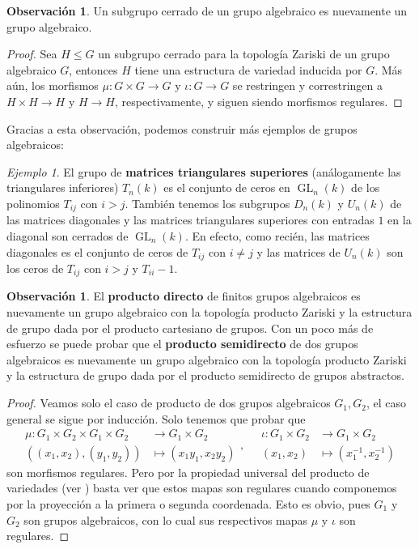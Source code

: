 \documentclass[spanish,12pt]{amsart}
\theoremstyle{definition}
\newtheorem{obs}[theorem]{Observación}
\theoremstyle{remark}
\newtheorem{example}[theorem]{Ejemplo}
\numberwithin{equation}{section}
\begin{document}
\begin{obs}\label{obs:subrupo cerrado de grupo algebraico es algebraico}
Un subgrupo cerrado de un grupo algebraico es nuevamente un grupo algebraico.
\end{obs}
\begin{proof}
Sea $H \leq G$ un subgrupo cerrado para la topología Zariski de un grupo algebraico $G$, entonces $H$ tiene una estructura de variedad inducida por $G$. Más aún, los morfismos $\mu : G \times G \to G$ y $\iota : G \to G$ se restringen y correstringen a $H \times H \to H$ y $H \to H$, respectivamente, y siguen siendo morfismos regulares.
\end{proof}

Gracias a esta observación, podemos construir más ejemplos de grupos algebraicos:
\begin{example}
El grupo de \textbf{matrices triangulares superiores} (análogamente las triangulares inferiores) $T_n (k)$ es el conjunto de ceros en $\operatorname{GL}_n (k)$ de los polinomios $T_{ij}$ con $i >j$. También tenemos los subgrupos $D_n (k)$ y $U_n (k)$ de las matrices diagonales y las matrices triangulares superiores con entradas $1$ en la diagonal son cerrados de $\operatorname{GL}_n (k)$. En efecto, como recién, las matrices diagonales es el conjunto de ceros de $T_{ij}$ con $i \neq j$ y las matrices de $U_n (k)$ son los ceros de $T_{ij}$ con $i > j$ y $T_{ii} - 1$.
\end{example}

\begin{obs}
El \textbf{producto directo} de finitos grupos algebraicos es nuevamente un grupo algebraico con la topología producto Zariski y la estructura de grupo dada por el producto cartesiano de grupos. Con un poco más de esfuerzo se puede probar que el \textbf{producto semidirecto} de dos grupos algebraicos es nuevamente un grupo algebraico con la topología producto Zariski y la estructura de grupo dada por el producto semidirecto de grupos abstractos.
\end{obs}
\begin{proof}
Veamos solo el caso de producto de dos grupos algebraicos $G_1, G_2$, el caso general se sigue por inducción. Solo tenemos que probar que
\[
    \begin{array}{ll}
    \mu : G_1 \times G_2 \times G_1 \times G_2 &\longrightarrow G_1 \times G_2 \\
    ((x_1,x_2),(y_1,y_2)) &\longmapsto (x_1 y_1, x_2 y_2)
    \end{array}, \quad
    \begin{array}{ll}
    \iota : G_1 \times G_2 &\longrightarrow G_1 \times G_2 \\
    (x_1, x_2) &\longmapsto (x_1^{-1}, x_2^{-1})
    \end{array}
\]
son morfismos regulares. Pero por la propiedad universal del producto de variedades (ver \cite[Teorema 2.6.5]{notas_pedro}) basta ver que estos mapas son regulares cuando componemos por la proyección a la primera o segunda coordenada. Esto es obvio, pues $G_1$ y $G_2$ son grupos algebraicos, con lo cual sus respectivos mapas $\mu$ y $\iota$ son regulares.
\end{proof}
\end{document}
